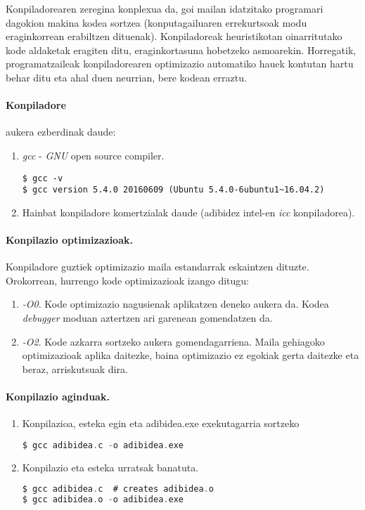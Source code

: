 Konpiladorearen zeregina konplexua da, goi mailan idatzitako programari dagokion makina kodea sortzea (konputagailuaren errekurtsoak modu eraginkorrean erabiltzen dituenak). Konpiladoreak heuristikotan oinarritutako kode aldaketak eragiten ditu, eraginkortasuna hobetzeko asmoarekin. Horregatik, programatzaileak konpiladorearen optimizazio automatiko hauek kontutan hartu behar ditu eta ahal duen neurrian, bere kodean erraztu.      

\paragraph*{Konpiladore} aukera ezberdinak daude:
\begin{enumerate}
\item \emph{gcc} - \emph{GNU} open source compiler.
\begin{lstlisting}
$ gcc -v
$ gcc version 5.4.0 20160609 (Ubuntu 5.4.0-6ubuntu1~16.04.2) 
\end{lstlisting}

\item Hainbat konpiladore komertzialak daude (adibidez intel-en \emph{icc} konpiladorea).

\end{enumerate}

\paragraph*{Konpilazio optimizazioak.}
Konpiladore guztiek optimizazio maila estandarrak eskaintzen dituzte. Orokorrean, hurrengo kode optimizazioak izango ditugu:
\begin{enumerate}
\item \emph{-O0}.
Kode optimizazio nagusienak aplikatzen deneko aukera da. Kodea \emph{debugger} moduan aztertzen ari garenean gomendatzen da.
\item \emph{-O2}.
Kode azkarra sortzeko aukera gomendagarriena. Maila gehiagoko optimizazioak aplika daitezke, baina optimizazio ez egokiak gerta daitezke eta beraz, arriskutsuak dira.   
\end{enumerate}  


\paragraph{Konpilazio aginduak.}

\begin{enumerate}
\item Konpilazioa, esteka egin eta adibidea.exe exekutagarria sortzeko
\begin{lstlisting}[language=C]
$ gcc adibidea.c -o adibidea.exe
\end{lstlisting}

\item Konpilazio eta esteka urratsak banatuta.
\begin{lstlisting}[language=C]
$ gcc adibidea.c  # creates adibidea.o
$ gcc adibidea.o -o adibidea.exe
\end{lstlisting}

\end{enumerate}

